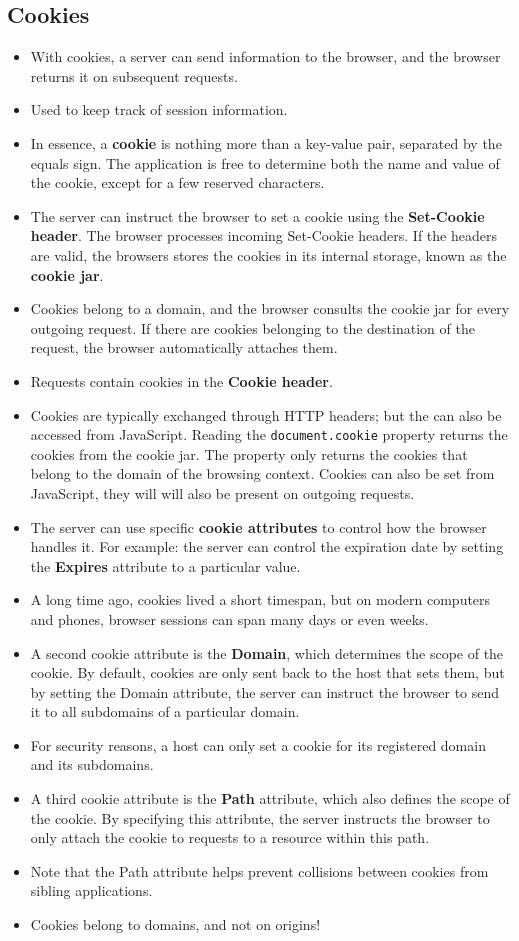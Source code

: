 \documentclass[../main.tex]{subfiles}
\begin{document}
\subsection{Cookies}
\begin{itemize}
\item With cookies, a server can send information to the browser, and the browser returns it on subsequent requests. \item Used to keep track of session information.
\item In essence, a \textbf{cookie} is nothing more than a key-value pair, separated by the equals sign. The application is free to determine both the name and value of the cookie, except for a few reserved characters.
\item The server can instruct the browser to set a cookie using the \textbf{Set-Cookie header}. The browser processes incoming Set-Cookie headers. If the headers are valid, the browsers stores the cookies in its internal storage, known as the \textbf{cookie jar}.
\item Cookies belong to a domain, and the browser consults the cookie jar for every outgoing request. If there are cookies belonging to the destination of the request, the browser automatically attaches them.
\item Requests contain cookies in the \textbf{Cookie header}.
\item Cookies are typically exchanged through HTTP headers; but the can also be accessed from JavaScript. Reading the \texttt{document.cookie} property returns the cookies from the cookie jar. The property only returns the cookies that belong to the domain of the browsing context. Cookies can also be set from JavaScript, they will will also be present on outgoing requests.
\item The server can use specific \textbf{cookie attributes} to control how the browser handles it. For example: the server can control the expiration date by setting the \textbf{Expires} attribute to a particular value.
\item A long time ago, cookies lived a short timespan, but on modern computers and phones, browser sessions can span many days or even weeks.
\item A second cookie attribute is the \textbf{Domain}, which determines the scope of the cookie. By default, cookies are only sent back to the host that sets them, but by setting the Domain attribute, the server can instruct the browser to send it to all subdomains of a particular domain.
\item For security reasons, a host can only set a cookie for its registered domain and its subdomains.
\item A third cookie attribute is the \textbf{Path} attribute, which also defines the scope of the cookie. By specifying this attribute, the server instructs the browser to only attach the cookie to requests to a resource within this path.
\item Note that the Path attribute helps prevent collisions between cookies from sibling applications.
\item Cookies belong to domains, and not on origins!
\end{itemize}
\end{document}
